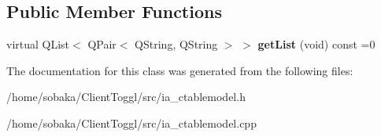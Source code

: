 \subsection*{Public Member Functions}
\begin{DoxyCompactItemize}
\item 
\mbox{\label{classIA__CTableModel_a4ed84b1d38e9e58c6df50423457158c2}} 
virtual Q\+List$<$ Q\+Pair$<$ Q\+String, Q\+String $>$ $>$ {\bfseries get\+List} (void) const =0
\end{DoxyCompactItemize}


The documentation for this class was generated from the following files\+:\begin{DoxyCompactItemize}
\item 
/home/sobaka/\+Client\+Toggl/src/ia\+\_\+ctablemodel.\+h\item 
/home/sobaka/\+Client\+Toggl/src/ia\+\_\+ctablemodel.\+cpp\end{DoxyCompactItemize}
